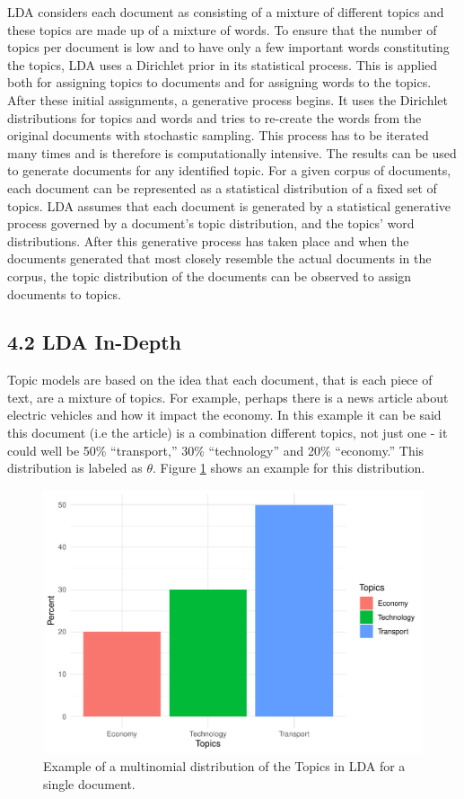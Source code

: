 \documentclass[
]{article}
\begin{document}
LDA considers each document as consisting of a mixture of different
topics and these topics are made up of a mixture of words. To ensure
that the number of topics per document is low and to have only a few
important words constituting the topics, LDA uses a Dirichlet prior in
its statistical process. This is applied both for assigning topics to
documents and for assigning words to the topics. After these initial
assignments, a generative process begins. It uses the Dirichlet
distributions for topics and words and tries to re-create the words from
the original documents with stochastic sampling. This process has to be
iterated many times and is therefore is computationally intensive. The
results can be used to generate documents for any identified topic. For
a given corpus of documents, each document can be represented as a
statistical distribution of a fixed set of topics. LDA assumes that each
document is generated by a statistical generative process governed by a
document's topic distribution, and the topics' word distributions. After
this generative process has taken place and when the documents generated
that most closely resemble the actual documents in the corpus, the topic
distribution of the documents can be observed to assign documents to
topics.

\hypertarget{lda-in-depth}{%
\subsection{4.2 LDA In-Depth}\label{lda-in-depth}}

Topic models are based on the idea that each document, that is each
piece of text, are a mixture of topics. For example, perhaps there is a
news article about electric vehicles and how it impact the economy. In
this example it can be said this document (i.e the article) is a
combination different topics, not just one - it could well be 50\%
``transport,'' 30\% ``technology'' and 20\% ``economy.'' This
distribution is labeled as \(\theta\). Figure \ref{fig:plot1} shows an
example for this distribution.

\begin{figure}

{\centering \includegraphics[width=0.8\linewidth]{00---Actual-Dissertation---Copy_files/figure-latex/plot1-1} 

}

\caption{Example of a multinomial distribution of the Topics in LDA for a single document.}\label{fig:plot1}
\end{figure}
\end{document}
